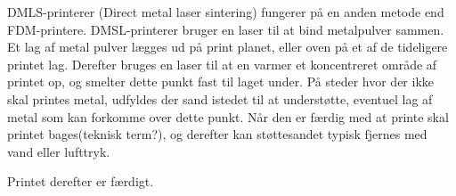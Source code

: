 DMLS-printerer (Direct metal laser sintering) fungerer på en anden metode end FDM-printere. DMSL-printerer bruger en laser til at bind metalpulver sammen. Et lag af metal pulver lægges ud på print planet, eller oven på et af de tideligere printet lag. Derefter bruges en laser til at en varmer et koncentreret område af printet op, og smelter dette punkt fast til laget under. På steder hvor der ikke skal printes metal, udfyldes der sand istedet til at understøtte, eventuel lag af metal som kan forkomme over dette punkt.
Når den er færdig med at printe skal printet bages(teknisk term?), og derefter kan støttesandet typisk fjernes med vand eller lufttryk.

Printet derefter er færdigt.



